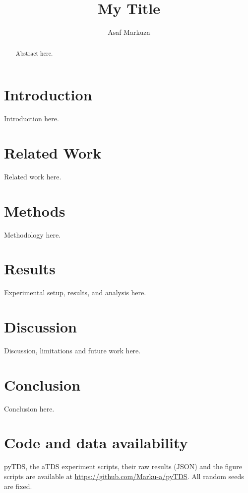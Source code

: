 \documentclass[11pt,a4paper]{article}
\title{My Title}
\author{Asaf Markuza}
\date{}
\begin{document}
\maketitle

\begin{abstract}
Abstract here.
\end{abstract}

\section{Introduction}
\label{sec:intro}
Introduction here.

\section{Related Work}
\label{sec:related_work}
Related work here.

\section{Methods}
\label{sec:method}
Methodology here.

\section{Results}
\label{sec:experiments}
Experimental setup, results, and analysis here.

\section{Discussion}
\label{sec:discussion}
Discussion, limitations and future work here.

\section{Conclusion}
\label{sec:conclusion}
Conclusion here.

\section*{Code and data availability}
pyTDS, the aTDS experiment scripts, their raw results (JSON) and the figure scripts are available at \url{https://github.com/Marku-a/pyTDS}. All random seeds are fixed.




\end{document}
